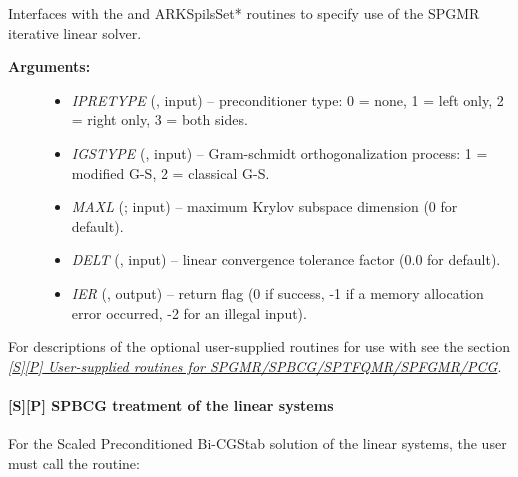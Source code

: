 \documentclass[letterpaper,10pt,english]{sphinxmanual}
\begin{document}
\begin{fulllineitems}
\label{f_interface/Usage:f/_/FARKSPGMR}
Interfaces with the {\hyperref[c_interface/User_callable:ARKSpgmr]{}} and ARKSpilsSet* routines
to specify use of the SPGMR iterative linear solver.
\begin{description}
\item[{\textbf{Arguments:}}] \leavevmode\begin{itemize}
\item {} 
\emph{IPRETYPE} (, input) -- preconditioner type: 0 = none,
1 = left only, 2 = right only, 3 = both sides.

\item {} 
\emph{IGSTYPE} (, input) -- Gram-schmidt orthogonalization
process: 1 = modified G-S, 2 = classical G-S.

\item {} 
\emph{MAXL} (; input) -- maximum Krylov subspace dimension
(0 for default).

\item {} 
\emph{DELT} (, input) -- linear convergence tolerance
factor (0.0 for default).

\item {} 
\emph{IER} (, output) -- return flag (0 if success, -1 if a
memory allocation error occurred, -2 for an illegal input).

\end{itemize}

\end{description}

\end{fulllineitems}


For descriptions of the optional user-supplied routines for use with
{\hyperref[f_interface/Usage:f/_/FARKSPGMR]{}} see the section {\hyperref[f_interface/Usage:finterface-spilsusersupplied]{\emph{{[}S{]}{[}P{]} User-supplied routines for SPGMR/SPBCG/SPTFQMR/SPFGMR/PCG}}}.


\paragraph{{[}\textbf{S}{]}{[}\textbf{P}{]} SPBCG treatment of the linear systems}
\label{f_interface/Usage:s-p-spbcg-treatment-of-the-linear-systems}
For the Scaled Preconditioned Bi-CGStab solution of the linear systems,
the user must call the {\hyperref[f_interface/Usage:f/_/FARKSPBCG]{}} routine:
\end{document}
